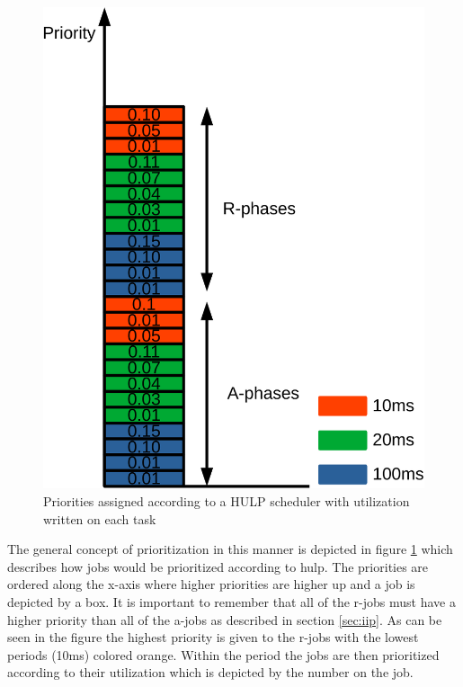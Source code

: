 \documentclass{kththesis}
\begin{document}
\begin{figure}

    \centering

    \includegraphics[width=0.8\linewidth]{images/scheduling_priorities.pdf}

    \caption{Priorities assigned according to a HULP scheduler with utilization written on each task}

    \label{fig:scheduling_priorities}

\end{figure}

The general concept of prioritization in this manner is depicted in figure
\ref{fig:scheduling_priorities} which describes how jobs would be prioritized according to
\acrshort{hulp}. The priorities are ordered along the x-axis where higher priorities are higher up
and a job is depicted by a box. It is important to remember that all of the \acrshort{r}-jobs must
have a higher priority than all of the \acrshort{a}-jobs as described in section \ref{sec:iip}. As
can be seen in the figure the highest priority is given to the \acrshort{r}-jobs with the lowest
periods (10ms) colored orange. Within the period the jobs are then prioritized according to their
utilization which is depicted by the number on the job. 


\end{document}
